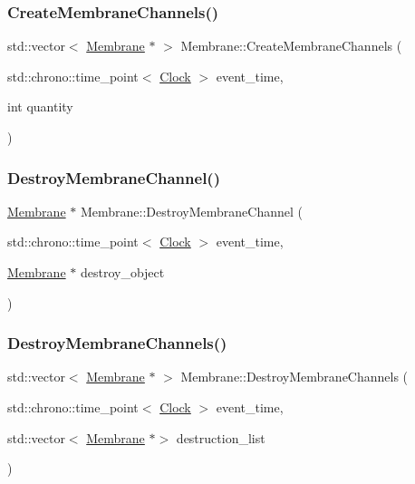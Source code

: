 \mbox{\label{classMembrane_a72987fae41e552af5befcd9a62aa6e46}} 
\subsubsection{\texorpdfstring{Create\+Membrane\+Channels()}{CreateMembraneChannels()}}
{\footnotesize\ttfamily std\+::vector$<$ \mbox{\hyperlink{classMembrane}{Membrane}} $\ast$ $>$ Membrane\+::\+Create\+Membrane\+Channels (\begin{DoxyParamCaption}\item[{std\+::chrono\+::time\+\_\+point$<$ \mbox{\hyperlink{universe_8h_a0ef8d951d1ca5ab3cfaf7ab4c7a6fd80}{Clock}} $>$}]{event\+\_\+time,  }\item[{int}]{quantity }\end{DoxyParamCaption})}

\mbox{\label{classMembrane_a12413d933a62b3bbb7931c6ab25de7de}} 
\subsubsection{\texorpdfstring{Destroy\+Membrane\+Channel()}{DestroyMembraneChannel()}}
{\footnotesize\ttfamily \mbox{\hyperlink{classMembrane}{Membrane}} $\ast$ Membrane\+::\+Destroy\+Membrane\+Channel (\begin{DoxyParamCaption}\item[{std\+::chrono\+::time\+\_\+point$<$ \mbox{\hyperlink{universe_8h_a0ef8d951d1ca5ab3cfaf7ab4c7a6fd80}{Clock}} $>$}]{event\+\_\+time,  }\item[{\mbox{\hyperlink{classMembrane}{Membrane}} $\ast$}]{destroy\+\_\+object }\end{DoxyParamCaption})}

\mbox{\label{classMembrane_aea71c4443f2fc22359ac3f770ff7755e}} 
\subsubsection{\texorpdfstring{Destroy\+Membrane\+Channels()}{DestroyMembraneChannels()}}
{\footnotesize\ttfamily std\+::vector$<$ \mbox{\hyperlink{classMembrane}{Membrane}} $\ast$ $>$ Membrane\+::\+Destroy\+Membrane\+Channels (\begin{DoxyParamCaption}\item[{std\+::chrono\+::time\+\_\+point$<$ \mbox{\hyperlink{universe_8h_a0ef8d951d1ca5ab3cfaf7ab4c7a6fd80}{Clock}} $>$}]{event\+\_\+time,  }\item[{std\+::vector$<$ \mbox{\hyperlink{classMembrane}{Membrane}} $\ast$$>$}]{destruction\+\_\+list }\end{DoxyParamCaption})}

